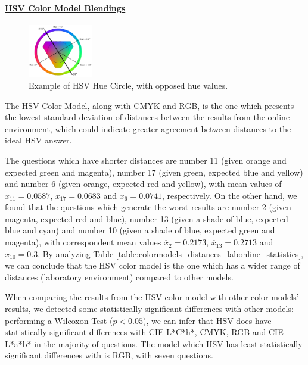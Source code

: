 \paragraph{\ul{HSV Color Model Blendings}} \par
\label{par:hsvcolormodel}
%
\begin{figure}
	\centering
    \vspace{-10pt}
	  \includegraphics[width=0.25\textwidth]{images/results/HSV_hue.png}
    \caption[Example of HSV Hue Circle, with opposed hue values.]{Example of HSV Hue Circle, with opposed hue values.}
    \label{fig:hsvcircles_example}
\end{figure}
%
The HSV Color Model, along with CMYK and RGB, is the one which presents the lowest standard deviation of distances between the results from the online environment, which could indicate greater agreement between distances
 to the ideal HSV answer. \par
%
The questions which have shorter distances are number 11 (given orange and expected green and magenta), number 17 (given green, expected blue and yellow) and number 6 (given orange,
expected red and yellow), with mean values of $\overline{x}_{11} = 0.0587$, $\overline{x}_{17} = 0.0683$ and $\overline{x}_{6} = 0.0741$, respectively.
On the other hand, we found that the questions which generate the worst results are number 2 (given magenta, expected red and blue), number 13 (given a shade of blue, expected blue and cyan) and number
10 (given a shade of blue, expected green and magenta), with correspondent mean values $\overline{x}_{2} = 0.2173$, $\overline{x}_{13} = 0.2713$ and
$\overline{x}_{10} = 0.3$.
By analyzing Table \ref{table:colormodels_distances_labonline_statistics}, we can conclude that the HSV color model is the one which has a wider range of distances (laboratory environment) compared to other models. \par
%
When comparing the results from the HSV color model with other color models' results, we detected some statistically significant differences with other models: performing a Wilcoxon Test ($p < 0.05$), we can infer that HSV does
have statistically significant differences with CIE-L*C*h*, CMYK, RGB and CIE-L*a*b* in the majority of questions. The model which HSV has least statistically significant differences with is RGB, with seven questions. \par
